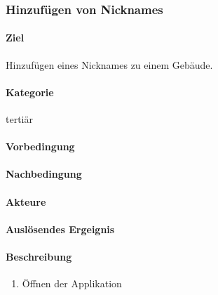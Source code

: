 \subsubsection{Hinzufügen von Nicknames}
\label{Hinzufügen von Nicknames}
\paragraph{Ziel}
Hinzufügen eines Nicknames zu einem Gebäude.
\paragraph{Kategorie}
tertiär
\paragraph{Vorbedingung}

\paragraph{Nachbedingung}

\paragraph{Akteure}

\paragraph{Auslösendes Ergeignis}

\paragraph{Beschreibung}
\begin{enumerate}
    \item Öffnen der Applikation
\end{enumerate}